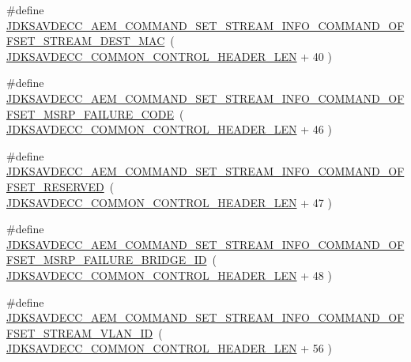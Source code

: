 \begin{DoxyCompactItemize}
\item 
\#define \hyperlink{group__command__set__stream__info_gaa166b601dec75ed9ef1deae81c019016}{J\+D\+K\+S\+A\+V\+D\+E\+C\+C\+\_\+\+A\+E\+M\+\_\+\+C\+O\+M\+M\+A\+N\+D\+\_\+\+S\+E\+T\+\_\+\+S\+T\+R\+E\+A\+M\+\_\+\+I\+N\+F\+O\+\_\+\+C\+O\+M\+M\+A\+N\+D\+\_\+\+O\+F\+F\+S\+E\+T\+\_\+\+S\+T\+R\+E\+A\+M\+\_\+\+D\+E\+S\+T\+\_\+\+M\+AC}~( \hyperlink{group__jdksavdecc__avtp__common__control__header_gaae84052886fb1bb42f3bc5f85b741dff}{J\+D\+K\+S\+A\+V\+D\+E\+C\+C\+\_\+\+C\+O\+M\+M\+O\+N\+\_\+\+C\+O\+N\+T\+R\+O\+L\+\_\+\+H\+E\+A\+D\+E\+R\+\_\+\+L\+EN} + 40 )
\item 
\#define \hyperlink{group__command__set__stream__info_ga515c5c6f6ac6794deafeaf32b4bb24ad}{J\+D\+K\+S\+A\+V\+D\+E\+C\+C\+\_\+\+A\+E\+M\+\_\+\+C\+O\+M\+M\+A\+N\+D\+\_\+\+S\+E\+T\+\_\+\+S\+T\+R\+E\+A\+M\+\_\+\+I\+N\+F\+O\+\_\+\+C\+O\+M\+M\+A\+N\+D\+\_\+\+O\+F\+F\+S\+E\+T\+\_\+\+M\+S\+R\+P\+\_\+\+F\+A\+I\+L\+U\+R\+E\+\_\+\+C\+O\+DE}~( \hyperlink{group__jdksavdecc__avtp__common__control__header_gaae84052886fb1bb42f3bc5f85b741dff}{J\+D\+K\+S\+A\+V\+D\+E\+C\+C\+\_\+\+C\+O\+M\+M\+O\+N\+\_\+\+C\+O\+N\+T\+R\+O\+L\+\_\+\+H\+E\+A\+D\+E\+R\+\_\+\+L\+EN} + 46 )
\item 
\#define \hyperlink{group__command__set__stream__info_gae7fc78f83a8d0a11ef8b10a66c4d0da8}{J\+D\+K\+S\+A\+V\+D\+E\+C\+C\+\_\+\+A\+E\+M\+\_\+\+C\+O\+M\+M\+A\+N\+D\+\_\+\+S\+E\+T\+\_\+\+S\+T\+R\+E\+A\+M\+\_\+\+I\+N\+F\+O\+\_\+\+C\+O\+M\+M\+A\+N\+D\+\_\+\+O\+F\+F\+S\+E\+T\+\_\+\+R\+E\+S\+E\+R\+V\+ED}~( \hyperlink{group__jdksavdecc__avtp__common__control__header_gaae84052886fb1bb42f3bc5f85b741dff}{J\+D\+K\+S\+A\+V\+D\+E\+C\+C\+\_\+\+C\+O\+M\+M\+O\+N\+\_\+\+C\+O\+N\+T\+R\+O\+L\+\_\+\+H\+E\+A\+D\+E\+R\+\_\+\+L\+EN} + 47 )
\item 
\#define \hyperlink{group__command__set__stream__info_gaadd0d884acd79184cdadac6fdee28cce}{J\+D\+K\+S\+A\+V\+D\+E\+C\+C\+\_\+\+A\+E\+M\+\_\+\+C\+O\+M\+M\+A\+N\+D\+\_\+\+S\+E\+T\+\_\+\+S\+T\+R\+E\+A\+M\+\_\+\+I\+N\+F\+O\+\_\+\+C\+O\+M\+M\+A\+N\+D\+\_\+\+O\+F\+F\+S\+E\+T\+\_\+\+M\+S\+R\+P\+\_\+\+F\+A\+I\+L\+U\+R\+E\+\_\+\+B\+R\+I\+D\+G\+E\+\_\+\+ID}~( \hyperlink{group__jdksavdecc__avtp__common__control__header_gaae84052886fb1bb42f3bc5f85b741dff}{J\+D\+K\+S\+A\+V\+D\+E\+C\+C\+\_\+\+C\+O\+M\+M\+O\+N\+\_\+\+C\+O\+N\+T\+R\+O\+L\+\_\+\+H\+E\+A\+D\+E\+R\+\_\+\+L\+EN} + 48 )
\item 
\#define \hyperlink{group__command__set__stream__info_gaa288f43b9bebe777e8c52d9ebbf87fcc}{J\+D\+K\+S\+A\+V\+D\+E\+C\+C\+\_\+\+A\+E\+M\+\_\+\+C\+O\+M\+M\+A\+N\+D\+\_\+\+S\+E\+T\+\_\+\+S\+T\+R\+E\+A\+M\+\_\+\+I\+N\+F\+O\+\_\+\+C\+O\+M\+M\+A\+N\+D\+\_\+\+O\+F\+F\+S\+E\+T\+\_\+\+S\+T\+R\+E\+A\+M\+\_\+\+V\+L\+A\+N\+\_\+\+ID}~( \hyperlink{group__jdksavdecc__avtp__common__control__header_gaae84052886fb1bb42f3bc5f85b741dff}{J\+D\+K\+S\+A\+V\+D\+E\+C\+C\+\_\+\+C\+O\+M\+M\+O\+N\+\_\+\+C\+O\+N\+T\+R\+O\+L\+\_\+\+H\+E\+A\+D\+E\+R\+\_\+\+L\+EN} + 56 )

\end{DoxyCompactItemize}
